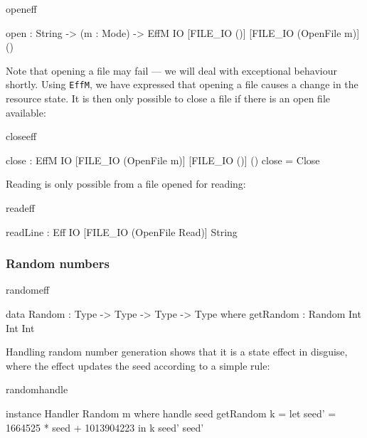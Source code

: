 \begin{SaveVerbatim}{openeff}

open : String -> (m : Mode) -> 
       EffM IO [FILE_IO ()] [FILE_IO (OpenFile m)] ()

\end{SaveVerbatim}

\noindent
Note that opening a file may fail --- we will deal with exceptional behaviour
shortly. 
Using \texttt{EffM}, we have expressed that opening a file causes a change in the
resource state.
It is then only possible to close a file if there is an open file
available:

\begin{SaveVerbatim}{closeeff}

close : EffM IO [FILE_IO (OpenFile m)] [FILE_IO ()] ()
close = Close

\end{SaveVerbatim}

\noindent
Reading is only possible from a file opened for reading:

\begin{SaveVerbatim}{readeff}

readLine : Eff IO [FILE_IO (OpenFile Read)] String

\end{SaveVerbatim}
\subsubsection{Random numbers}

\begin{SaveVerbatim}{randomeff}

data Random : Type -> Type -> Type -> Type where
     getRandom : Random Int Int Int

\end{SaveVerbatim}

\noindent
Handling random number generation shows that it is a state effect in
disguise, where the effect updates the seed according to a simple rule:

\begin{SaveVerbatim}{randomhandle}

instance Handler Random m where
    handle seed getRandom k
         = let seed' = 1664525 * seed + 1013904223 in
               k seed' seed'

\end{SaveVerbatim}

